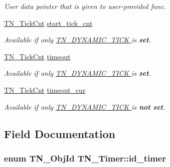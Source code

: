 \begin{DoxyCompactItemize}
\begin{DoxyCompactList}\small\item\em User data pointer that is given to user-\/provided {\ttfamily func}. \end{DoxyCompactList}\item 
\hyperlink{tn__common_8h_ac885b63d00c063de61cdbd80bf26d8aa}{T\+N\+\_\+\+Tick\+Cnt} \hyperlink{structTN__Timer_ab1410fa78c9099a6bc4dd3f43f1f52e4}{start\+\_\+tick\+\_\+cnt}
\begin{DoxyCompactList}\small\item\em {\itshape Available if only \hyperlink{tn__cfg__default_8h_aaee875834a86f961318c584095c366fe}{{\ttfamily T\+N\+\_\+\+D\+Y\+N\+A\+M\+I\+C\+\_\+\+T\+I\+C\+K} } is {\bfseries set}.} \end{DoxyCompactList}\item 
\hyperlink{tn__common_8h_ac885b63d00c063de61cdbd80bf26d8aa}{T\+N\+\_\+\+Tick\+Cnt} \hyperlink{structTN__Timer_a893c5b01ec38bdcbcf2294cc950ffd09}{timeout}
\begin{DoxyCompactList}\small\item\em {\itshape Available if only \hyperlink{tn__cfg__default_8h_aaee875834a86f961318c584095c366fe}{{\ttfamily T\+N\+\_\+\+D\+Y\+N\+A\+M\+I\+C\+\_\+\+T\+I\+C\+K} } is {\bfseries set}.} \end{DoxyCompactList}\item 
\hyperlink{tn__common_8h_ac885b63d00c063de61cdbd80bf26d8aa}{T\+N\+\_\+\+Tick\+Cnt} \hyperlink{structTN__Timer_a6041c660dad74778f668bac9ae844465}{timeout\+\_\+cur}
\begin{DoxyCompactList}\small\item\em {\itshape Available if only \hyperlink{tn__cfg__default_8h_aaee875834a86f961318c584095c366fe}{{\ttfamily T\+N\+\_\+\+D\+Y\+N\+A\+M\+I\+C\+\_\+\+T\+I\+C\+K} } is {\bfseries not set}.} \end{DoxyCompactList}\end{DoxyCompactItemize}


\subsection{Field Documentation}
\hypertarget{structTN__Timer_a27482d3470455064da95b9453ae87156}{
\subsubsection[{id\+\_\+timer}]{\setlength{\rightskip}{0pt plus 5cm}enum {\bf T\+N\+\_\+\+Obj\+Id} T\+N\+\_\+\+Timer\+::id\+\_\+timer}}\label{structTN__Timer_a27482d3470455064da95b9453ae87156}


